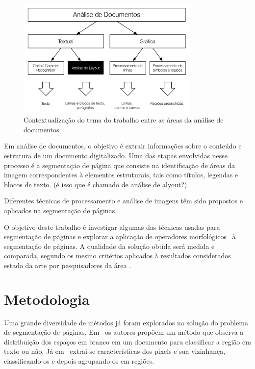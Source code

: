 \documentclass[times, 10pt,twocolumn]{article}
\begin{document}
\begin{figure}[htb!]
\begin{center}
\includegraphics[width=0.8\textwidth]{assets/document_processing_areas_hierarquies.pdf}
\end{center}
\caption{Contextualização do tema do trabalho entre as áreas da análise de documentos.}
\label{fig:context1}
\end{figure}

Em análise de documentos, o objetivo é extrair informações sobre o
conteúdo e estrutura de um documento digitalizado. Uma das etapas
envolvidas nesse processo é a segmentação de página que consiste na
identificação de áreas da imagem correspondentes à elementos
estruturais, tais como títulos, legendas e blocos de texto.
(é isso que é chamado de análise de alyout?)

Diferentes técnicas de processamento e análise de imagens têm sido
propostos e aplicados na segmentação de páginas.

O objetivo deste trabalho é investigar algumas das técnicas usadas
para segmentação de páginas e explorar a aplicação de operadores
morfológicos~\cite{Serra:1983:IAM:1098652} à segmentação de páginas. A qualidade da solução
obtida será medida e comparada, segundo os mesmo critérios aplicados à
resultados considerados estado da arte por pesquisadores da área
\cite{10.1109/ICDAR.2007.207}.


\section{Metodologia}

Uma grande diversidade de métodos já foram explorados na solução do
problema de segmentação de
páginas. Em~\cite{Antonacopoulos95representationand} os autores
propõem um método
que observa a distribuição dos espaços em branco em um documento para
classificar a região em texto ou não. Já
em~\cite{Moll07documentcontent} extrai-se características dos pixels e
sua vizinhança, classificando-os e depois agrupando-os em regiões.
\end{document}
